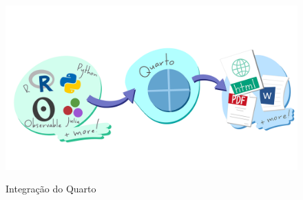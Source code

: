 \documentclass[
  a4paper,
]{book}
\begin{document}
\begin{figure}

\href{https://datascience.arizona.edu/events/reproducible-reporting-quarto}{\includegraphics{img/quarto-illustration.png}}

\caption{\label{fig-quarto-illustration}Integração do Quarto}

\end{figure}%
\end{document}
